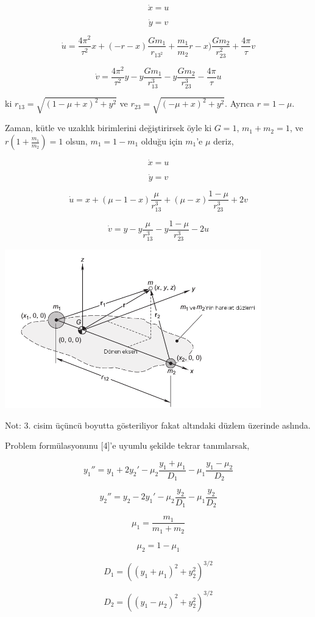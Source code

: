 \documentclass[12pt,fleqn]{article}\usepackage{../../common}
\begin{document}
$$ \dot{x} = u$$

$$ \dot{y} = v $$

$$ \dot{u} = 
\frac{4\pi^2}{\tau^2}x +  (-r-x)\frac{Gm_1}{r_{13^2}} +
\frac{m_1}{m_2}r-x) \frac{Gm_2}{r_{23}^2} +  \frac{4\pi}{\tau}v
$$

$$ \dot{v} =
\frac{4\pi^2}{\tau^2}y -y \frac{Gm_1}{r_{13}^3}-
y \frac{Gm_2}{r_{23}^3}-\frac{4\pi}{\tau}u
$$

ki $r_{13} = \sqrt{(1-\mu+x)^2+y^2}$ ve $r_{23} = \sqrt{(-\mu+x)^2+y^2}$. Ayrıca $r=1-\mu$.

Zaman, kütle ve uzaklık birimlerini değiştirirsek öyle ki $G=1$,
$m_1+m_2=1$, ve $r(1+\frac{m_1}{m_2})=1$ olsun, $m_1 = 1-m_1$ olduğu için
$m_1$'e $\mu$ deriz,

$$ \dot{x} = u$$

$$ \dot{y} = v $$

$$ \dot{u} = x + (\mu - 1 - x ) \frac{\mu}{r_{13}^3} + 
   (\mu-x)\frac{1-\mu}{r_{23}^3} + 2v 
$$

$$ \dot{v} = y - y \frac{\mu}{r_{13}^3} - y \frac{1-\mu}{r_{23}^3}-2u$$

\includegraphics[width=30em]{chaos_app01_04.png}

Not: 3. cisim üçüncü boyutta gösteriliyor fakat altındaki düzlem üzerinde aslında.

Problem formülasyonunu [4]'e uyumlu şekilde tekrar tanımlarsak,

$$ 
y_1'' = y_1 + 2y_2' - \mu_2 \frac{y_1+\mu_1}{D_1} - \mu_1 \frac{y_1-\mu_2}{D_2}
$$

$$ 
y_2'' = y_2 - 2y_1' - \mu_2 \frac{y_2}{D_1} -\mu_1 \frac{y_2}{D_2}
$$

$$\mu_1 = \frac{m_1}{m_1+m_2}$$

$$\mu_2 = 1-\mu_1$$

$$ D_1 = ((y_1+\mu_1)^2 + y_2^2 )^{3/2}$$

$$ D_2 = ((y_1-\mu_2)^2 + y_2^2 )^{3/2}$$
\end{document}
